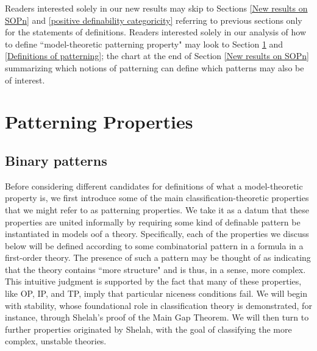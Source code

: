 \documentclass{article}
\theoremstyle{definition}
\theoremstyle{definition}
\theoremstyle{definition}
\begin{document}
Readers interested solely in our new results may skip to Sections \ref{New results on SOPn} and \ref{positive definability categoricity}
referring to previous sections only for the statements of definitions. Readers interested solely in our analysis of how to define ``model-theoretic patterning property" may look to Section \ref{Patterning properties} and \ref{Definitions of patterning}; the chart at the end of Section \ref{New results on SOPn} summarizing which notions of patterning can define which patterns may also be of interest.

\section{Patterning Properties}\label{Patterning properties}

\subsection{Binary patterns}


Before considering different candidates for definitions of what a model-theoretic property is, we first introduce some of the main classification-theoretic properties that we might refer to as patterning properties. We take it as a datum that these properties are united informally by requiring some kind of definable pattern be instantiated in models oof a theory. Specifically, each of the properties we discuss below will be defined according to some combinatorial pattern in a formula in a first-order theory. The presence of such a pattern may be thought of as indicating that the theory contains ``more structure" and is thus, in a sense, more complex. This intuitive judgment is supported by the fact that many of these properties, like OP, IP, and TP, imply that particular niceness conditions fail. We will begin with stability, whose foundational role in classification theory is demonstrated, for instance, through Shelah's proof of the Main Gap Theorem. We will then turn to further properties originated by Shelah, with the goal of classifying the more complex, unstable theories.
\end{document}
